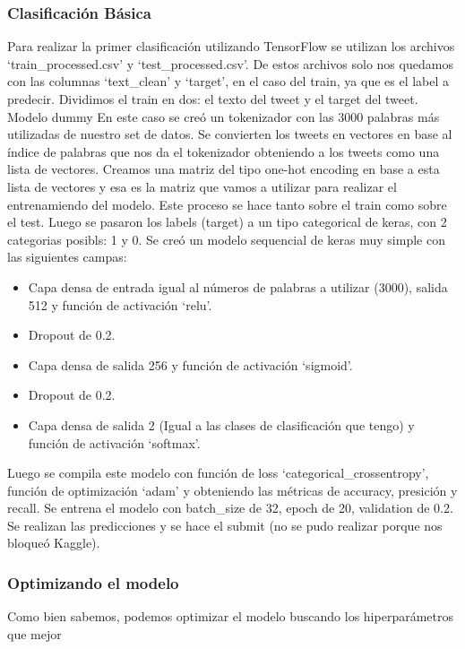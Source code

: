 \documentclass[12pt]{article}
\begin{document}
\subsubsection{Clasificación Básica}
Para realizar la primer clasificación utilizando TensorFlow se utilizan los archivos ‘train\_processed.csv’ y ‘test\_processed.csv’.
De estos archivos solo nos quedamos con las columnas ‘text\_clean’ y ‘target’, en el caso del train, ya que es el label a predecir.
Dividimos el train en dos: el texto del tweet y el target del tweet.
Modelo dummy
En este caso se creó un tokenizador con las 3000 palabras más utilizadas de nuestro set de datos.
Se convierten los tweets en vectores en base al índice de palabras que nos da el tokenizador obteniendo a los tweets como una lista de vectores.
Creamos una matriz del tipo one-hot encoding en base a esta lista de vectores y esa es la matriz que vamos a utilizar para realizar el entrenamiendo del modelo. Este proceso se hace tanto sobre el train como sobre el test.
Luego se pasaron los labels (target) a un tipo categorical de keras, con 2 categorias posibls: 1 y 0.
Se creó un modelo sequencial de keras muy simple con las siguientes campas:
\begin{itemize}
  \item Capa densa de entrada igual al números de palabras a utilizar (3000), salida 512 y función de activación ‘relu’.
  \item Dropout de 0.2.
  \item Capa densa de salida 256 y función de activación ‘sigmoid’.
  \item Dropout de 0.2.
  \item Capa densa de salida 2 (Igual a las clases de clasificación que tengo) y función de activación ‘softmax’.
\end{itemize}
Luego se compila este modelo con función de loss ‘categorical\_crossentropy’, función de optimización ‘adam’ y obteniendo las métricas de accuracy, presición y recall.
Se entrena el modelo con batch\_size de 32, epoch de 20, validation de 0.2.
Se realizan las predicciones y se hace el submit (no se pudo realizar porque nos bloqueó Kaggle).


\subsubsection{Optimizando el modelo}
Como bien sabemos, podemos optimizar el modelo buscando los hiperparámetros que mejor 


\newpage
\end{document}

